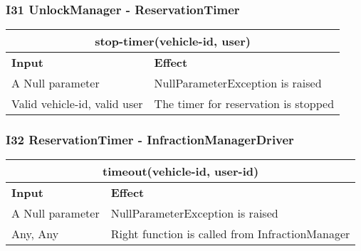 \subsubsection{I31 UnlockManager - ReservationTimer} 
\begin{tabular}{|p{5cm}|p{7cm}|}
\hline
\multicolumn{2}{|c|}{stop-timer(vehicle-id, user)} \\
\hline
\textbf{Input} & \textbf{Effect} \\

\hline
A Null parameter & NullParameterException is raised \\

\hline
Valid vehicle-id, valid user & The timer for reservation is stopped \\
\hline
\end{tabular}

\subsubsection{I32 ReservationTimer - InfractionManagerDriver} 
\begin{tabular}{|p{5cm}|p{7cm}|}
\hline
\multicolumn{2}{|c|}{timeout(vehicle-id, user-id)} \\
\hline
\textbf{Input} & \textbf{Effect} \\

\hline
A Null parameter & NullParameterException is raised \\

\hline
Any, Any & Right function is called from InfractionManager \\
\hline
\end{tabular}

